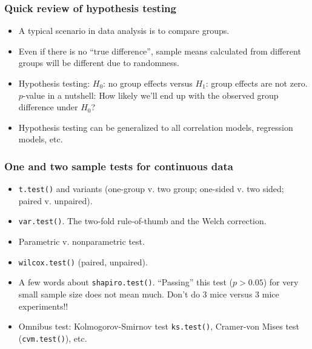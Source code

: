 \begin{frame}
  \frametitle{Quick review of hypothesis testing}
  \begin{itemize}
  \item A typical scenario in data analysis is to compare groups.
  \item Even if there is no ``true difference'', sample means
    calculated from different groups will be different due to
    randomness.
  \item Hypothesis testing: $H_{0}$: no group effects versus $H_{1}$:
    group effects are not zero.  $p$-value in a nutshell: How likely
    we'll end up with the observed group difference under $H_{0}$?
  \item Hypothesis testing can be generalized to all correlation
    models, regression models, etc.
  \end{itemize}
\end{frame}


\begin{frame}
  \frametitle{One and two sample tests for continuous data}
  \begin{itemize}
  \item \texttt{t.test()} and variants (one-group v. two group;
    one-sided v. two sided; paired v. unpaired).
  \item \texttt{var.test()}.  The two-fold rule-of-thumb and the Welch
    correction. 
  \item Parametric v. nonparametric test.
  \item \texttt{wilcox.test()} (paired, unpaired).
  \item A few words about \texttt{shapiro.test()}. ``Passing'' this
    test ($p>0.05$) for very small sample size does not mean much.
    Don't do 3 mice versus 3 mice experiments!!
  \item Omnibus test: Kolmogorov-Smirnov test \texttt{ks.test()},
    Cramer-von Mises test (\texttt{cvm.test()}), etc.
  \end{itemize}
\end{frame}

